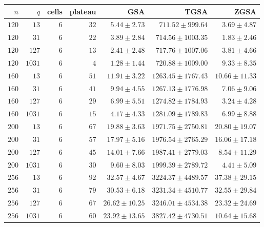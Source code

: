 \begin{tabular}{@{}rrrrrrr@{}}
  \toprule
  $n$ & $q$ & cells & plateau & GSA & TGSA & ZGSA \\
  \midrule
  $120$ & $13$ & $6$ & $32$ & $5.44\mathbin{\pm}2.73$ & $711.52\mathbin{\pm}999.64$ & $3.69\mathbin{\pm}4.87$ \\
  $120$ & $31$ & $6$ & $22$ & $3.89\mathbin{\pm}2.84$ & $714.56\mathbin{\pm}1003.35$ & $1.83\mathbin{\pm}2.46$ \\
  $120$ & $127$ & $6$ & $13$ & $2.41\mathbin{\pm}2.48$ & $717.76\mathbin{\pm}1007.06$ & $3.81\mathbin{\pm}4.66$ \\
  $120$ & $1031$ & $6$ & $4$ & $1.28\mathbin{\pm}1.44$ & $720.88\mathbin{\pm}1009.00$ & $9.33\mathbin{\pm}8.35$ \\
  $160$ & $13$ & $6$ & $51$ & $11.91\mathbin{\pm}3.22$ & $1263.45\mathbin{\pm}1767.43$ & $10.66\mathbin{\pm}11.33$ \\
  $160$ & $31$ & $6$ & $41$ & $9.94\mathbin{\pm}4.55$ & $1267.13\mathbin{\pm}1776.98$ & $7.06\mathbin{\pm}9.06$ \\
  $160$ & $127$ & $6$ & $29$ & $6.99\mathbin{\pm}5.51$ & $1274.82\mathbin{\pm}1784.93$ & $3.24\mathbin{\pm}4.28$ \\
  $160$ & $1031$ & $6$ & $15$ & $4.17\mathbin{\pm}4.33$ & $1281.09\mathbin{\pm}1789.83$ & $6.99\mathbin{\pm}8.88$ \\
  $200$ & $13$ & $6$ & $67$ & $19.88\mathbin{\pm}3.63$ & $1971.75\mathbin{\pm}2750.81$ & $20.80\mathbin{\pm}19.07$ \\
  $200$ & $31$ & $6$ & $57$ & $17.97\mathbin{\pm}5.16$ & $1976.54\mathbin{\pm}2765.29$ & $16.06\mathbin{\pm}17.18$ \\
  $200$ & $127$ & $6$ & $45$ & $14.01\mathbin{\pm}7.66$ & $1987.41\mathbin{\pm}2779.03$ & $8.54\mathbin{\pm}11.29$ \\
  $200$ & $1031$ & $6$ & $30$ & $9.60\mathbin{\pm}8.03$ & $1999.39\mathbin{\pm}2789.72$ & $4.41\mathbin{\pm}5.09$ \\
  $256$ & $13$ & $6$ & $92$ & $32.57\mathbin{\pm}4.67$ & $3224.37\mathbin{\pm}4489.57$ & $37.38\mathbin{\pm}29.15$ \\
  $256$ & $31$ & $6$ & $79$ & $30.53\mathbin{\pm}6.18$ & $3231.34\mathbin{\pm}4510.77$ & $32.55\mathbin{\pm}29.84$ \\
  $256$ & $127$ & $6$ & $67$ & $26.62\mathbin{\pm}10.25$ & $3246.01\mathbin{\pm}4534.38$ & $23.32\mathbin{\pm}24.69$ \\
  $256$ & $1031$ & $6$ & $60$ & $23.92\mathbin{\pm}13.65$ & $3827.42\mathbin{\pm}4730.51$ & $10.64\mathbin{\pm}15.68$ \\

\end{tabular}
